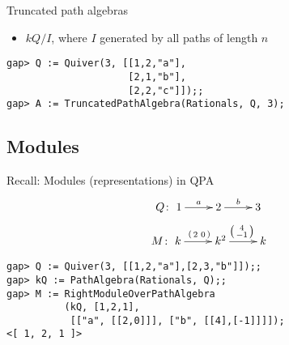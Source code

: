 \begin{frame}[fragile]{Truncated path algebras}
\begin{itemize}
\item $kQ/I$, where $I$ generated by all paths of length $n$
\end{itemize}
\begin{verbatim}
gap> Q := Quiver(3, [[1,2,"a"],
                     [2,1,"b"],
                     [2,2,"c"]]);;
gap> A := TruncatedPathAlgebra(Rationals, Q, 3);
\end{verbatim}
\end{frame}


\subsection{Modules}

\begin{frame}[fragile]{Recall: Modules (representations) in QPA}
\[
Q \colon
\xymatrix{1 \ar[r]^a & 2 \ar[r]^b & 3}
\]
\[
M \colon
\xymatrix{
k   \ar[r]^{\left( \begin{smallmatrix} 2 & 0 \end{smallmatrix} \right)} &
k^2 \ar[r]^{\left( \begin{smallmatrix} 4 \\ -1 \end{smallmatrix} \right)} &
k
}
\]
\begin{verbatim}
gap> Q := Quiver(3, [[1,2,"a"],[2,3,"b"]]);;
gap> kQ := PathAlgebra(Rationals, Q);;
gap> M := RightModuleOverPathAlgebra
          (kQ, [1,2,1],
           [["a", [[2,0]]], ["b", [[4],[-1]]]]);
<[ 1, 2, 1 ]>
\end{verbatim}
\end{frame}

